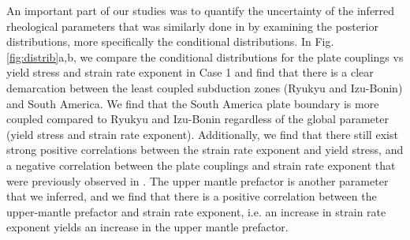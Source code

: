\documentclass[12pt]{article}
\begin{document}
An important part of our studies was to quantify the uncertainty of the inferred rheological parameters that was similarly done in \citep{ratnaswamy2015adjoint} by examining the posterior distributions, more specifically the conditional distributions. In Fig.\ref{fig:distrib}a,b, we compare the conditional distributions for the plate couplings vs yield stress and strain rate exponent in Case 1 and find that there is a clear demarcation between the least coupled subduction zones (Ryukyu and Izu-Bonin) and South America. We find that the South America plate boundary is more coupled compared to Ryukyu and Izu-Bonin regardless of the global parameter (yield stress and strain rate exponent).
 Additionally, we find that there still exist strong positive correlations between the strain rate exponent and yield stress, and a negative correlation between the plate couplings and strain rate exponent that were previously observed in \citep{ratnaswamy2015adjoint}.  The upper mantle prefactor is another parameter that we inferred, and we find that there is a positive correlation between the upper-mantle prefactor and strain rate exponent, i.e. an increase in strain rate exponent yields an increase in the upper mantle prefactor. 
\end{document}
